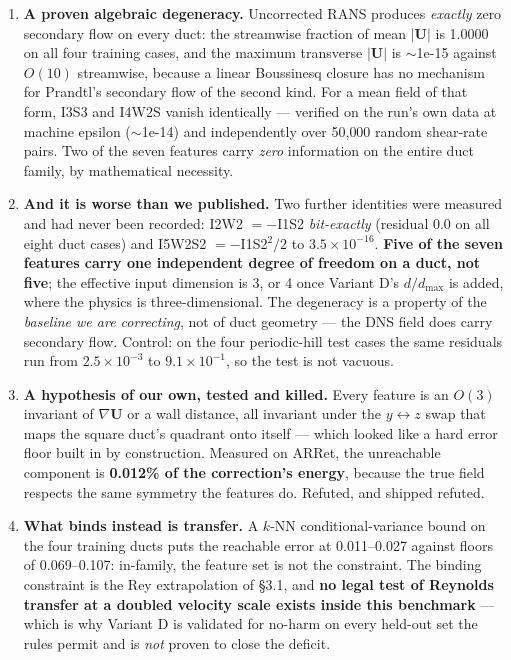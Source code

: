 \documentclass[11pt,a4paper]{article}
\newcommand{\breakus}{\textunderscore\allowbreak}
\newcommand{\code}[1]{{\small\ttfamily\let\_\breakus #1}}
\begin{document}
\begin{enumerate}
\item \textbf{A proven algebraic degeneracy.} Uncorrected RANS produces \emph{exactly} zero
  secondary flow on every duct: the streamwise fraction of mean $|\mathbf{U}|$ is 1.0000 on
  all four training cases, and the maximum transverse $|\mathbf{U}|$ is $\sim$1e-15 against
  $O(10)$ streamwise, because a linear Boussinesq closure has no mechanism for Prandtl's
  secondary flow of the second kind. For a mean field of that form, \code{I3\_S3} and
  \code{I4\_W2S} vanish identically --- verified on the run's own data at machine epsilon
  ($\sim$1e-14) and independently over 50{,}000 random shear-rate pairs. Two of the seven
  features carry \emph{zero} information on the entire duct family, by mathematical
  necessity.
\item \textbf{And it is worse than we published.} Two further identities were measured and
  had never been recorded: \code{I2\_W2} $= -$\code{I1\_S2} \emph{bit-exactly} (residual 0.0
  on all eight duct cases) and \code{I5\_W2S2} $= -$\code{I1\_S2}$^2/2$ to $3.5\times
  10^{-16}$. \textbf{Five of the seven features carry one independent degree of freedom on
  a duct, not five}; the effective input dimension is 3, or 4 once Variant D's $d/d_{\max}$
  is added, where the physics is three-dimensional. The degeneracy is a property of the
  \emph{baseline we are correcting}, not of duct geometry --- the DNS field does carry
  secondary flow. Control: on the four periodic-hill test cases the same residuals run from
  $2.5\times10^{-3}$ to $9.1\times10^{-1}$, so the test is not vacuous.
\item \textbf{A hypothesis of our own, tested and killed.} Every feature is an $O(3)$
  invariant of $\nabla\mathbf{U}$ or a wall distance, all invariant under the $y
  \leftrightarrow z$ swap that maps the square duct's quadrant onto itself --- which looked
  like a hard error floor built in by construction. Measured on \code{AR\_1\_Ret\_180}, the
  unreachable component is \textbf{0.012\% of the correction's energy}, because the true
  field respects the same symmetry the features do. Refuted, and shipped refuted.
\item \textbf{What binds instead is transfer.} A $k$-NN conditional-variance bound on the
  four training ducts puts the reachable error at 0.011--0.027 against floors of
  0.069--0.107: in-family, the feature set is not the constraint. The binding constraint is
  the \code{Re\_y} extrapolation of \S3.1, and \textbf{no legal test of Reynolds transfer at
  a doubled velocity scale exists inside this benchmark} --- which is why Variant D is
  validated for no-harm on every held-out set the rules permit and is \emph{not} proven to
  close the deficit.
\end{enumerate}
\end{document}
